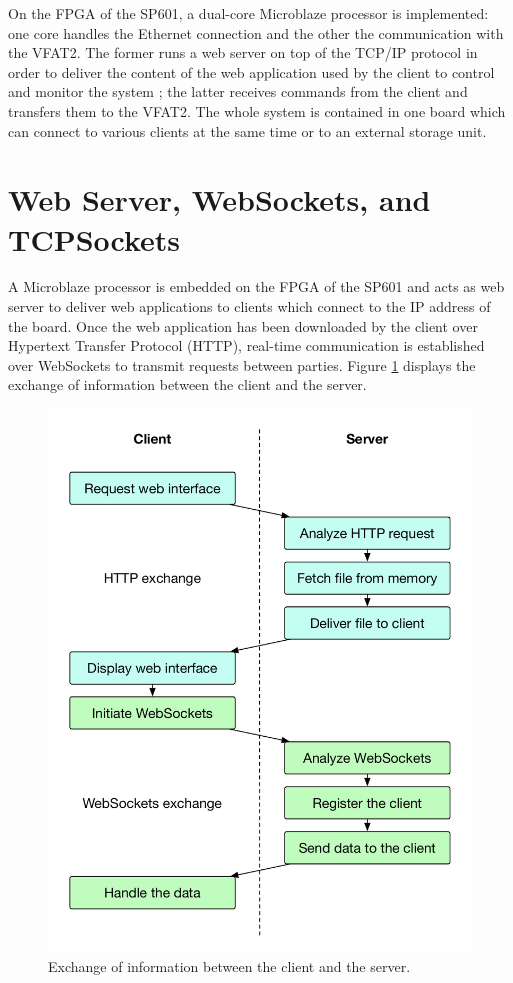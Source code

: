     On the FPGA of the SP601, a dual-core Microblaze processor is implemented: one core handles the Ethernet connection and the other the communication with the VFAT2. The former runs a web server on top of the TCP/IP protocol in order to deliver the content of the web application used by the client to control and monitor the system ; the latter receives commands from the client and transfers them to the VFAT2. The whole system is contained in one board which can connect to various clients at the same time or to an external storage unit.

  \section{Web Server, WebSockets, and TCPSockets}

    A Microblaze processor is embedded on the FPGA of the SP601 and acts as web server to deliver web applications to clients which connect to the IP address of the board. Once the web application has been downloaded by the client over Hypertext Transfer Protocol (HTTP), real-time communication is established over WebSockets to transmit requests between parties. Figure \ref{fig:III-2-flow} displays the exchange of information between the client and the server.

    \begin{figure}[p!]
      \centering
      \includegraphics[width=\textwidth]{img/III-2-web-daq/flow}
      \caption{Exchange of information between the client and the server.}
      \label{fig:III-2-flow}
    \end{figure}

